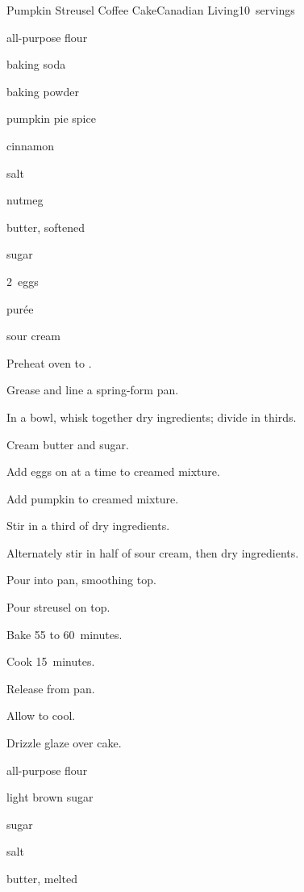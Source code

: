 \begin{recipe}{Pumpkin Streusel Coffee Cake}{Canadian Living}{10~servings}

\begin{ingredients}
\item \C{1\half} all-purpose flour
\item {} baking soda
\item {} baking powder
\item \tp{1\half} pumpkin pie spice
\item {} cinnamon
\item \tp{\half} salt
\item \tp{\quarter} nutmeg
\item \C{\half} butter, softened
\item {} sugar
\item 2~eggs
\item {}  pur\'ee
\item \C{\half} sour cream
\end{ingredients}

\begin{directions}
\item Preheat oven to .
\item Grease and line a  spring-form pan.
\item In a bowl, whisk together dry ingredients; divide in thirds.
\item Cream butter and sugar.
\item Add eggs on at a time to creamed mixture.
\item Add pumpkin to creamed mixture.
\item Stir in a third of dry ingredients.
\item Alternately stir in half of sour cream, then dry ingredients.
\item Pour into pan, smoothing top.
\item Pour streusel on top.
\item Bake 55 to 60~minutes.
\item Cook 15~minutes.
\item Release from pan.
\item Allow to cool.
\item Drizzle glaze over cake.
\end{directions}


\begin{ingredients}
\item \C{\threequarter} all-purpose flour
\item \C{\quarter} light brown sugar
\item \C{\quarter} sugar
\item \tp{\quarter} salt
\item \C{\quarter} butter, melted
\end{ingredients}


\end{recipe}
